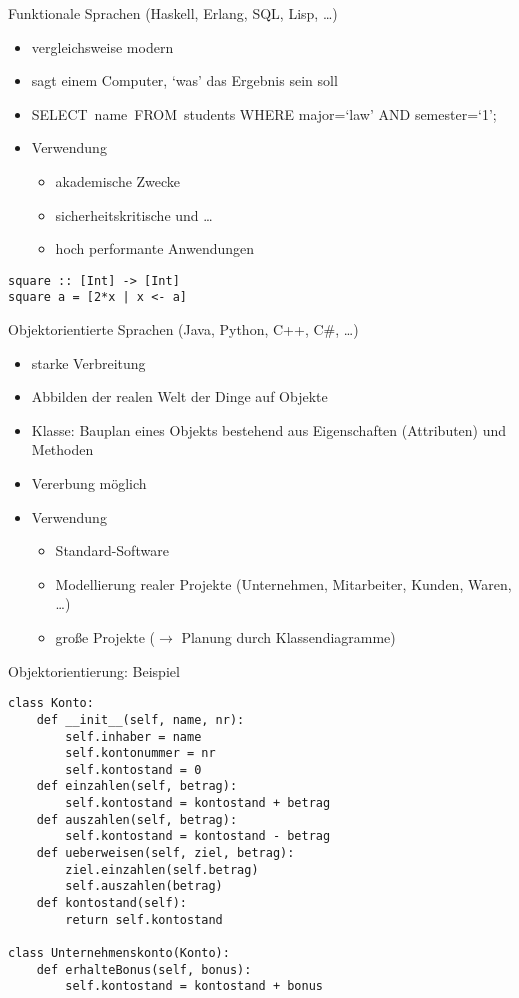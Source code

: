 \begin{frame}[fragile]{Funktionale Sprachen (Haskell, Erlang, SQL, Lisp, \dots)}
    \begin{itemize}
       \item vergleichsweise modern
       \item sagt einem Computer, `was' das Ergebnis sein soll
       \item SELECT name FROM students WHERE major=‘law’ AND semester=‘1’;
       \item Verwendung
        \begin{itemize}
            \item akademische Zwecke
            \item sicherheitskritische und \dots
            \item hoch performante Anwendungen
        \end{itemize}
    \end{itemize}
    \begin{lstlisting}
square :: [Int] -> [Int]
square a = [2*x | x <- a]
    \end{lstlisting}
\end{frame}

\begin{frame}[fragile]{Objektorientierte Sprachen (Java, Python, C++, C\#, \dots)}
    \begin{itemize}
       \item starke Verbreitung
       \item Abbilden der realen Welt der Dinge auf Objekte
       \item Klasse: Bauplan eines Objekts bestehend aus Eigenschaften (Attributen) und Methoden
       \item Vererbung möglich
       \item Verwendung
        \begin{itemize}
            \item Standard-Software
            \item Modellierung realer Projekte (Unternehmen, Mitarbeiter, Kunden, Waren, \dots)
            \item große Projekte ($\rightarrow$ Planung durch Klassendiagramme)
        \end{itemize}
    \end{itemize}
\end{frame}

\begin{frame}[fragile]{Objektorientierung: Beispiel}
    \begin{lstlisting}
class Konto:
    def __init__(self, name, nr):
        self.inhaber = name
        self.kontonummer = nr
        self.kontostand = 0
    def einzahlen(self, betrag):
        self.kontostand = kontostand + betrag
    def auszahlen(self, betrag):
        self.kontostand = kontostand - betrag
    def ueberweisen(self, ziel, betrag): 
        ziel.einzahlen(self.betrag)
        self.auszahlen(betrag)
    def kontostand(self):
        return self.kontostand

class Unternehmenskonto(Konto):
    def erhalteBonus(self, bonus):
        self.kontostand = kontostand + bonus
    \end{lstlisting}
\end{frame}

